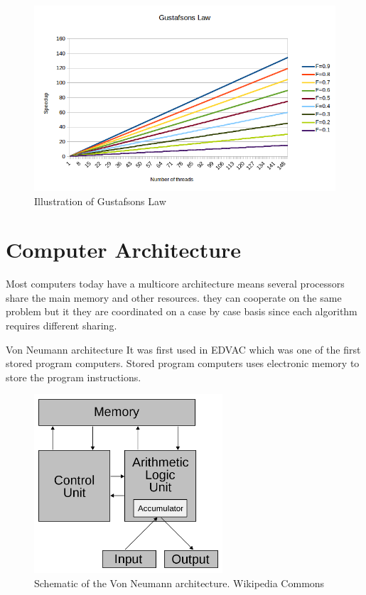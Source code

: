 \documentclass[10pt,a4paper]{report}
\begin{document}
\begin{figure}[h]
    \centering
    \includegraphics[width=13cm]{GustafsonsLaw.png}
    \caption{Illustration of Gustafsons Law}
    \label{fig:GustafsonsLaw}
\end{figure}

\clearpage
\section{Computer Architecture}
Most computers today have a multicore architecture
means several processors share the main memory and other resources. they can cooperate on the same problem but it they are coordinated on a case by case basis since each algorithm requires different sharing.

Von Neumann architecture
It was first used in EDVAC which was one of the first stored program computers\cite{von1993first}. Stored program computers uses electronic memory to store the program instructions\cite{computer_arch_2003}.

\begin{figure}[h]
    \centering
    \includegraphics[width=7cm]{Von_Neumann_architecture.png}
    \caption{Schematic of the Von Neumann architecture. Wikipedia Commons}
    \label{fig:VonNeumann}
\end{figure}
\end{document}
